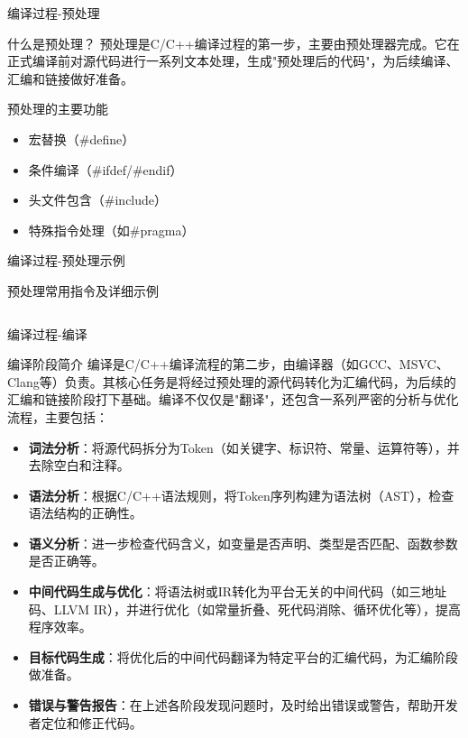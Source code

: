 \documentclass[UTF8,aspectratio=169]{beamer}
\begin{document}
\begin{frame}{编译过程-预处理}
    \begin{ytublock}{什么是预处理？}
        预处理是C/C++编译过程的第一步，主要由预处理器完成。它在正式编译前对源代码进行一系列文本处理，生成"预处理后的代码"，为后续编译、汇编和链接做好准备。
    \end{ytublock}
    \begin{ytublock}{预处理的主要功能}
        \begin{itemize}
            \item 宏替换（\#define）
            \item 条件编译（\#ifdef/\#endif）
            \item 头文件包含（\#include）
            \item 特殊指令处理（如\#pragma）
        \end{itemize}
    \end{ytublock}
\end{frame}

\begin{frame}{编译过程-预处理示例}
    \begin{ytublock}{预处理常用指令及详细示例}
        \inputminted{cpp}{code/preproc.cpp}
    \end{ytublock}
\end{frame}

\begin{frame}{编译过程-编译}
    \begin{ytublock}{编译阶段简介}
        \small
        编译是C/C++编译流程的第二步，由编译器（如GCC、MSVC、Clang等）负责。其核心任务是将经过预处理的源代码转化为汇编代码，为后续的汇编和链接阶段打下基础。编译不仅仅是"翻译"，还包含一系列严密的分析与优化流程，主要包括：
        \begin{itemize}
            \item \textbf{词法分析}：将源代码拆分为Token（如关键字、标识符、常量、运算符等），并去除空白和注释。
            \item \textbf{语法分析}：根据C/C++语法规则，将Token序列构建为语法树（AST），检查语法结构的正确性。
            \item \textbf{语义分析}：进一步检查代码含义，如变量是否声明、类型是否匹配、函数参数是否正确等。
            \item \textbf{中间代码生成与优化}：将语法树或IR转化为平台无关的中间代码（如三地址码、LLVM IR），并进行优化（如常量折叠、死代码消除、循环优化等），提高程序效率。
            \item \textbf{目标代码生成}：将优化后的中间代码翻译为特定平台的汇编代码，为汇编阶段做准备。
            \item \textbf{错误与警告报告}：在上述各阶段发现问题时，及时给出错误或警告，帮助开发者定位和修正代码。
        \end{itemize}
    \end{ytublock}
\end{frame}
\end{document}
